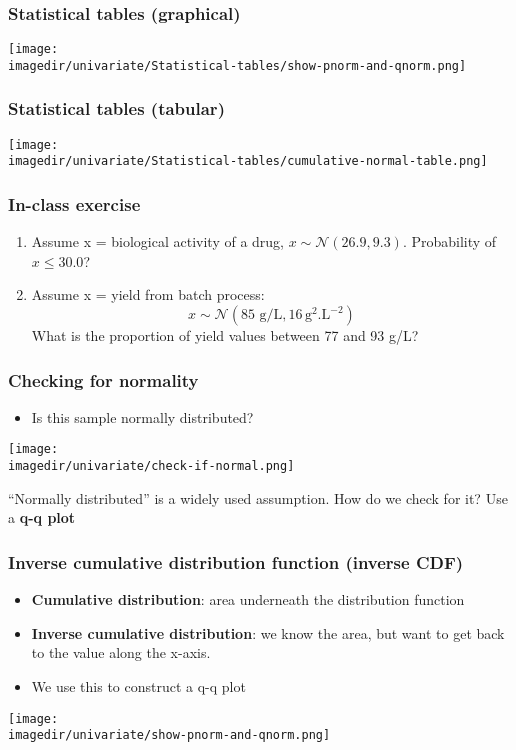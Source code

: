 \begin{frame}\frametitle{Statistical tables (graphical)}
	\begin{center}
		\texttt{[image: \\imagedir/univariate/Statistical-tables/show-pnorm-and-qnorm.png]}
	\end{center}
\end{frame}

\begin{frame}\frametitle{Statistical tables (tabular)}
	\begin{center}
		\texttt{[image: \\imagedir/univariate/Statistical-tables/cumulative-normal-table.png]}
	\end{center}
\end{frame}

\begin{frame}\frametitle{In-class exercise}
	\begin{enumerate}
		\item	Assume x = biological activity of a drug, $x \sim \mathcal{N}(26.9, 9.3)$. Probability of $x \leq 30.0$?
		\vspace{24pt}
		\item	Assume x = yield from batch process:
				$$x \sim \mathcal{N}(85 \text{~g/L}, 16\, \text{g}^2\text{.L}^{-2})$$
				What is the proportion of yield values between 77 and 93 g/L?
	\end{enumerate}
\end{frame}

\begin{frame}\frametitle{Checking for normality}
	\begin{itemize}
		\item	Is this sample normally distributed?
	\end{itemize}
	\begin{center}
		\texttt{[image: \\imagedir/univariate/check-if-normal.png]}
	\end{center}
	``Normally distributed'' is a widely used assumption. How do we check for it? Use a \textbf{q-q plot}
\end{frame}

\begin{frame}\frametitle{Inverse cumulative distribution function (inverse CDF)}
	\begin{itemize}
		\item	\textbf{Cumulative distribution}: area underneath the distribution function
		\item	\textbf{Inverse cumulative distribution}: we know the area, but want to get back to the value along the x-axis.
		\item	We use this to construct a q-q plot
	\end{itemize}
	\vspace{-4pt}
	\begin{center}
		\texttt{[image: \\imagedir/univariate/show-pnorm-and-qnorm.png]}
	\end{center}
\end{frame}

